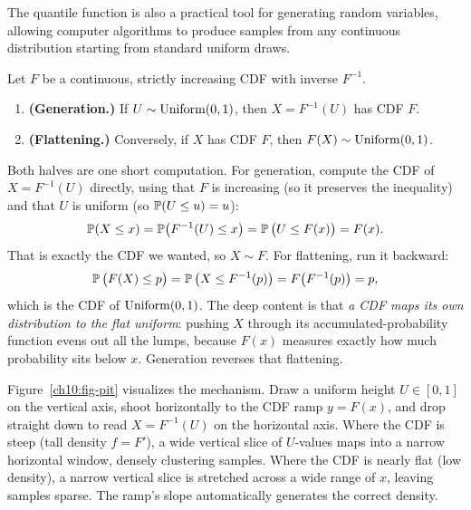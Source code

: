 The quantile function is also a practical tool for generating random variables,
allowing computer algorithms to produce samples from any continuous distribution
starting from standard uniform draws.

\begin{theorem}
\label{ch10:thm-pit}
Let $F$ be a continuous, strictly increasing CDF with inverse $F^{-1}$.
\begin{enumerate}
\item \textbf{(Generation.)} If $U \sim \Unif(0,1)$, then $X = F^{-1}(U)$ has CDF
      $F$.
\item \textbf{(Flattening.)} Conversely, if $X$ has CDF $F$, then $F(X) \sim
      \Unif(0,1)$.
\end{enumerate}
\end{theorem}

\begin{whybox}
Both halves are one short computation. For generation, compute the CDF of
$X = F^{-1}(U)$ directly, using that $F$ is increasing (so it preserves the
inequality) and that $U$ is uniform (so $\P(U \le u) = u$):
\[
  \P(X \le x) = \P\!\big(F^{-1}(U) \le x\big) = \P\big(U \le F(x)\big) = F(x).
\]
That is exactly the CDF we wanted, so $X \sim F$. For flattening, run it backward:
\[
  \P\big(F(X) \le p\big) = \P\big(X \le F^{-1}(p)\big) = F\big(F^{-1}(p)\big) = p,
\]
which is the CDF of $\Unif(0,1)$. The deep content is that \emph{a CDF maps its own
distribution to the flat uniform}: pushing $X$ through its accumulated-probability
function evens out all the lumps, because $F(x)$ measures exactly how much
probability sits below $x$. Generation reverses that flattening.

Figure~\ref{ch10:fig-pit} visualizes the mechanism. Draw a uniform height
$U \in [0,1]$ on the vertical axis, shoot horizontally to the CDF ramp $y=F(x)$,
and drop straight down to read $X = F^{-1}(U)$ on the horizontal axis. Where the
CDF is steep (tall density $f = F'$), a wide vertical slice of $U$-values maps into
a narrow horizontal window, densely clustering samples. Where the CDF is nearly
flat (low density), a narrow vertical slice is stretched across a wide range of
$x$, leaving samples sparse. The ramp's slope automatically generates the correct
density.
\end{whybox}

